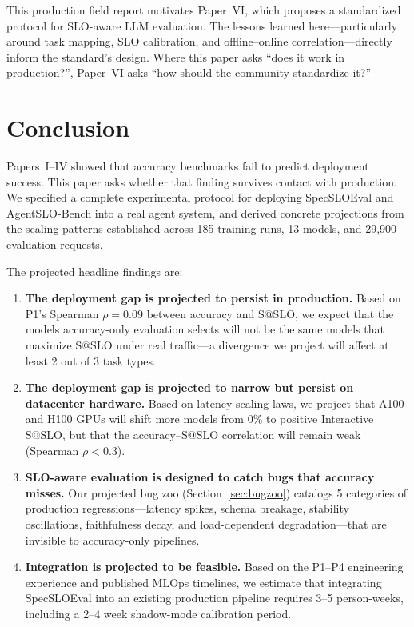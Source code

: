 \documentclass[11pt]{article}
\makeatletter
\newcommand{\sslo}{\ensuremath{\mathrm{S@SLO}}}
\makeatother
\begin{document}
This production field report motivates Paper~VI, which proposes a standardized protocol for SLO-aware LLM evaluation. The lessons learned here---particularly around task mapping, SLO calibration, and offline--online correlation---directly inform the standard's design. Where this paper asks ``does it work in production?'', Paper~VI asks ``how should the community standardize it?''

\section{Conclusion}
\label{sec:conclusion}

Papers~I--IV showed that accuracy benchmarks fail to predict deployment success. This paper asks whether that finding survives contact with production. We specified a complete experimental protocol for deploying SpecSLOEval and AgentSLO-Bench into a real agent system, and derived concrete projections from the scaling patterns established across 185 training runs, 13 models, and 29,900 evaluation requests.

The projected headline findings are:

\begin{enumerate}[leftmargin=16pt]
    \item \textbf{The deployment gap is projected to persist in production.} Based on P1's Spearman $\rho = 0.09$ between accuracy and $\sslo{}$, we expect that the models accuracy-only evaluation selects will not be the same models that maximize $\sslo{}$ under real traffic---a divergence we project will affect at least 2 out of 3 task types.

    \item \textbf{The deployment gap is projected to narrow but persist on datacenter hardware.} Based on latency scaling laws, we project that A100 and H100 GPUs will shift more models from 0\% to positive Interactive $\sslo{}$, but that the accuracy--$\sslo{}$ correlation will remain weak (Spearman $\rho < 0.3$).

    \item \textbf{SLO-aware evaluation is designed to catch bugs that accuracy misses.} Our projected bug zoo (Section~\ref{sec:bugzoo}) catalogs 5 categories of production regressions---latency spikes, schema breakage, stability oscillations, faithfulness decay, and load-dependent degradation---that are invisible to accuracy-only pipelines.

    \item \textbf{Integration is projected to be feasible.} Based on the P1--P4 engineering experience and published MLOps timelines, we estimate that integrating SpecSLOEval into an existing production pipeline requires 3--5 person-weeks, including a 2--4 week shadow-mode calibration period.
\end{enumerate}
\end{document}
